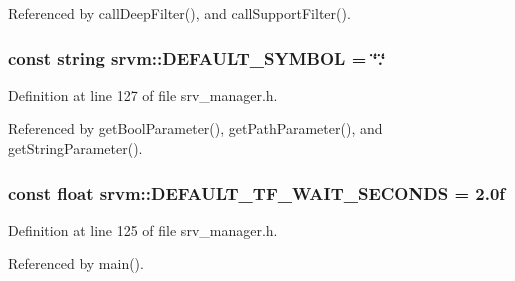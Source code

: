 Referenced by call\-Deep\-Filter(), and call\-Support\-Filter().

\hypertarget{namespacesrvm_a01e5397d10883ed88b8d0abf1cfdd2ff}{
\subsubsection[{D\-E\-F\-A\-U\-L\-T\-\_\-\-S\-Y\-M\-B\-O\-L}]{\setlength{\rightskip}{0pt plus 5cm}const string srvm\-::\-D\-E\-F\-A\-U\-L\-T\-\_\-\-S\-Y\-M\-B\-O\-L = \char`\"{}.\char`\"{}}}\label{namespacesrvm_a01e5397d10883ed88b8d0abf1cfdd2ff}


Definition at line 127 of file srv\-\_\-manager.\-h.



Referenced by get\-Bool\-Parameter(), get\-Path\-Parameter(), and get\-String\-Parameter().

\hypertarget{namespacesrvm_a6debc60d19f8c5cfe2e7746da001f0d1}{
\subsubsection[{D\-E\-F\-A\-U\-L\-T\-\_\-\-T\-F\-\_\-\-W\-A\-I\-T\-\_\-\-S\-E\-C\-O\-N\-D\-S}]{\setlength{\rightskip}{0pt plus 5cm}const float srvm\-::\-D\-E\-F\-A\-U\-L\-T\-\_\-\-T\-F\-\_\-\-W\-A\-I\-T\-\_\-\-S\-E\-C\-O\-N\-D\-S = 2.\-0f}}\label{namespacesrvm_a6debc60d19f8c5cfe2e7746da001f0d1}


Definition at line 125 of file srv\-\_\-manager.\-h.



Referenced by main().

